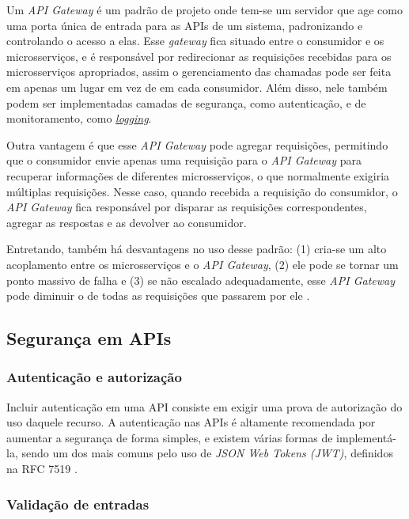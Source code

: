 Um \emph{API Gateway} é um padrão de projeto onde tem-se um servidor que age como uma porta única de entrada para as APIs de um sistema, padronizando e controlando o acesso a elas. Esse \emph{gateway} fica situado entre o consumidor e os microsserviços, e é responsável por redirecionar as requisições recebidas para os microsserviços apropriados, assim o gerenciamento das chamadas pode ser feita em apenas um lugar em vez de em cada consumidor. Além disso, nele também podem ser implementadas camadas de segurança, como autenticação, e de monitoramento, como \hyperref[subsecao-registros]{\emph{logging}}.

Outra vantagem é que esse \emph{API Gateway} pode agregar requisições, permitindo que o consumidor envie apenas uma requisição para o \emph{API Gateway} para recuperar informações de diferentes microsserviços, o que normalmente exigiria múltiplas requisições. Nesse caso, quando recebida a requisição do consumidor, o \emph{API Gateway} fica responsável por disparar as requisições correspondentes, agregar as respostas e as devolver ao consumidor.

Entretando, também há desvantagens no uso desse padrão: (1) cria-se um alto acoplamento entre os microsserviços e o \emph{API Gateway}, (2) ele pode se tornar um ponto massivo de falha e (3) se não escalado adequadamente, esse \emph{API Gateway} pode diminuir o de todas as requisições que passarem por ele \cite{microsoft-api-gateway}.

\subsection{Segurança em APIs}

\subsubsection*{Autenticação e autorização}

Incluir autenticação em uma API consiste em exigir uma prova de autorização do uso daquele recurso. A autenticação nas APIs é altamente recomendada por aumentar a segurança de forma simples, e existem várias formas de implementá-la, sendo um dos mais comuns pelo uso de \emph{JSON Web Tokens (JWT)}, definidos na RFC 7519 \cite{rfc_http_nielsen_1999}.

\subsubsection*{Validação de entradas}

